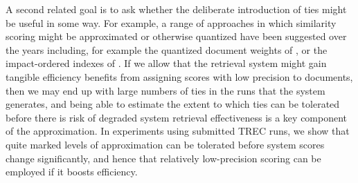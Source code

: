 A second related goal is to ask whether the deliberate introduction
of ties might be useful in some way.
For example, a range of approaches in which similarity scoring might
be approximated or otherwise quantized have been suggested over the
years including, for example
the quantized document weights of {\citet{mzs94ipm}}, or
the impact-ordered indexes of {\citet{am06sigir}}.
If we allow that the retrieval system might gain tangible efficiency
benefits from assigning scores with low precision to
documents,
then we may end up with large
numbers of ties in the runs that the system generates,
and being able to estimate the extent to which ties can
be tolerated before there is risk of degraded system retrieval
effectiveness is a key component of the approximation.
In experiments using submitted TREC runs, we show that quite marked
levels of approximation can be tolerated before system scores change
significantly, and hence that relatively low-precision scoring can be
employed if it boosts efficiency.


